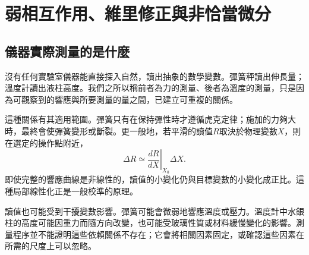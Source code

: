 \chapter{弱相互作用、維里修正與非恰當微分}


\section{儀器實際測量的是什麼}

沒有任何實驗室儀器能直接探入自然，讀出抽象的數學變數。彈簧秤讀出伸長量；溫度計讀出液柱高度。我們之所以稱前者為力的測量、後者為溫度的測量，只是因為可觀察到的響應與所要測量的量之間，已建立可重複的關係。

這種關係有其適用範圍。彈簧只有在保持彈性時才遵循虎克定律；施加的力夠大時，最終會使彈簧變形或斷裂。更一般地，若平滑的讀值\(R\)取決於物理變數\(X\)，則在選定的操作點附近，
\begin{equation}
 \Delta R \simeq
 \left.\frac{dR}{dX}\right|_{X_0}\Delta X.
 \label{eq:sm6-local-linear-response}
\end{equation}
即使完整的響應曲線是非線性的，讀值的小變化仍與目標變數的小變化成正比。這種局部線性化正是一般校準的原理。

讀值也可能受到干擾變數影響。彈簧可能會微弱地響應溫度或壓力。溫度計中水銀柱的高度可能因重力而隨方向改變，也可能受玻璃性質或材料緩慢變化的影響。測量程序並不能證明這些依賴關係不存在；它會將相關因素固定，或確認這些因素在所需的尺度上可以忽略。

\begin{classroomqa}
\end{classroomqa}

\begin{classroomqa}
\end{classroomqa}

